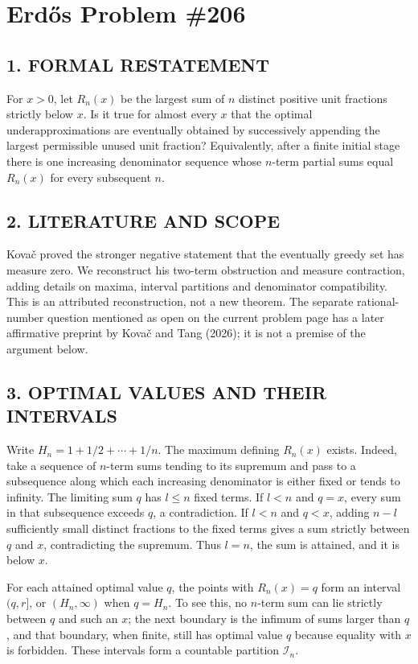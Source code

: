 \section{Erd\H{o}s Problem \#206}
\subsection*{1. FORMAL RESTATEMENT}
For $x>0$, let $R_n(x)$ be the largest sum of $n$ distinct positive unit fractions strictly below $x$. Is it true for almost every $x$ that the optimal underapproximations are eventually obtained by successively appending the largest permissible unused unit fraction? Equivalently, after a finite initial stage there is one increasing denominator sequence whose $n$-term partial sums equal $R_n(x)$ for every subsequent $n$.
\subsection*{2. LITERATURE AND SCOPE}
Kova\v{c} proved the stronger negative statement that the eventually greedy set has measure zero. We reconstruct his two-term obstruction and measure contraction, adding details on maxima, interval partitions and denominator compatibility. This is an attributed reconstruction, not a new theorem. The separate rational-number question mentioned as open on the current problem page has a later affirmative preprint by Kova\v{c} and Tang (2026); it is not a premise of the argument below.
\subsection*{3. OPTIMAL VALUES AND THEIR INTERVALS}
Write $H_n=1+1/2+\cdots+1/n$. The maximum defining $R_n(x)$ exists. Indeed, take a sequence of $n$-term sums tending to its supremum and pass to a subsequence along which each increasing denominator is either fixed or tends to infinity. The limiting sum $q$ has $l\le n$ fixed terms. If $l<n$ and $q=x$, every sum in that subsequence exceeds $q$, a contradiction. If $l<n$ and $q<x$, adding $n-l$ sufficiently small distinct fractions to the fixed terms gives a sum strictly between $q$ and $x$, contradicting the supremum. Thus $l=n$, the sum is attained, and it is below $x$.

For each attained optimal value $q$, the points with $R_n(x)=q$ form an interval $(q,r]$, or $(H_n,\infty)$ when $q=H_n$. To see this, no $n$-term sum can lie strictly between $q$ and such an $x$; the next boundary is the infimum of sums larger than $q$, and that boundary, when finite, still has optimal value $q$ because equality with $x$ is forbidden. These intervals form a countable partition $\mathcal I_n$.

